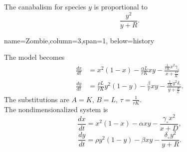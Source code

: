 \documentclass[landscape,final,a0paper,fontscale=0.285]{baposter}
\begin{document}
\begin{poster}
{  The canabalism for species $y$ is proportional to $$\frac{y^2}{y+R}.$$ 
	
}

   {name=Zombie,column=3,span=1, below=history}{
    
    The model becomes
        \begin{align*}
            \frac{dx}{dt} & = x^2 (1-x) - \frac{\alpha L}{rK} xy - \frac{\frac{1}{rK}x^2 \gamma_\circ}{x + \frac{D}{K}} \\
            \frac{dy}{dt} & = \frac{\rho L}{rK} y^2 (1-y) - \frac{\beta}{r} xy - \frac{\frac{1}{rK}y^2 \delta_\circ}{y + \frac{R}{L}}.
        \end{align*} 
        The substitutions are
        $A=K$, \hspace{.4em} $B=L$,\hspace{.4em} $\tau=\frac{1}{rK}.$\\ [3pt]
       
       The nondimensionalized system is
    $$\frac{dx}{dt} = x^2 (1-x) - \alpha xy - \frac{\gamma_\circ x^2}{x+D},$$
    $$\frac{dy}{dt} = \rho y^2 (1-y) - \beta xy -\frac{\delta_\circ y^2}{y+R}.$$
 }


 







\end{poster}
\end{document}
